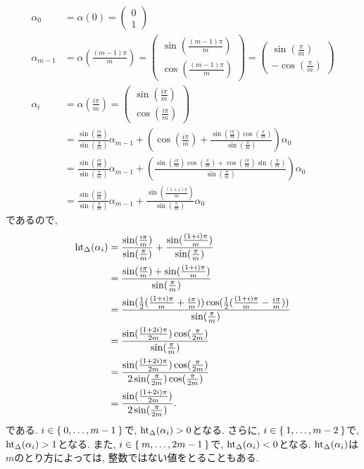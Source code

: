 \begin{align*}
  \alpha_0&=\alpha(0)=\begin{pmatrix}0\\1\end{pmatrix}\\
  \alpha_{m-1}&=\alpha(\frac{(m-1)\pi}{m})=
  \begin{pmatrix}\sin(\frac{(m-1)\pi}{m})\\\cos(\frac{(m-1)\pi}{m})\end{pmatrix}=
\begin{pmatrix}\sin(\frac{\pi}{m})\\-\cos(\frac{\pi}{m})\end{pmatrix}
  \\
  \alpha_{i}&=\alpha(\frac{i\pi}{m})=
  \begin{pmatrix}\sin(\frac{i\pi}{m})\\\cos(\frac{i\pi}{m})\end{pmatrix}\\
  &=
  \frac{\sin(\frac{i\pi}{m})}{\sin(\frac{\pi}{m})}\alpha_{m-1}
  +
  (\cos(\frac{i\pi}{m})+\frac{\sin(\frac{i\pi}{m})\cos(\frac{\pi}{m})}{\sin(\frac{\pi}{m})})\alpha_{0}\\
  &=
  \frac{\sin(\frac{i\pi}{m})}{\sin(\frac{\pi}{m})}\alpha_{m-1}
  +
  (\frac{\sin(\frac{i\pi}{m})\cos(\frac{\pi}{m})+\cos(\frac{i\pi}{m})\sin(\frac{\pi}{m})}{\sin(\frac{\pi}{m})})\alpha_{0}\\
  &=
  \frac{\sin(\frac{i\pi}{m})}{\sin(\frac{\pi}{m})}\alpha_{m-1}
  +
  \frac{\sin(\frac{(1+i)\pi}{m})}{\sin(\frac{\pi}{m})}\alpha_{0}
\end{align*}
であるので,
\begin{align*}
  \operatorname{ht}_{\Delta}(\alpha_i)
  &=
  \frac{\sin(\frac{i\pi}{m})}{\sin(\frac{\pi}{m})}
  +
  \frac{\sin(\frac{(1+i)\pi}{m})}{\sin(\frac{\pi}{m})}\\
  &=
  \frac{\sin(\frac{i\pi}{m})+\sin(\frac{(1+i)\pi}{m})}{\sin(\frac{\pi}{m})}\\
  &=
  \frac{\sin(\frac{1}{2}(\frac{(1+i)\pi}{m}+\frac{i\pi}{m}))\cos(\frac{1}{2}(\frac{(1+i)\pi}{m}-\frac{i\pi}{m}))}{\sin(\frac{\pi}{m})}\\
  &=
  \frac{\sin(\frac{(1+2i)\pi}{2m})\cos(\frac{\pi}{2m})}{\sin(\frac{\pi}{m})}\\
  &=
  \frac{\sin(\frac{(1+2i)\pi}{2m})\cos(\frac{\pi}{2m})}{2\sin(\frac{\pi}{2m})\cos(\frac{\pi}{2m})}\\
  &=
  \frac{\sin(\frac{(1+2i)\pi}{2m})}{2\sin(\frac{\pi}{2m})}.
\end{align*}
である.
$i\in \Set{0,\ldots,m-1}$で, $\operatorname{ht}_\Delta(\alpha_i)>0$となる.
さらに,
$i\in \Set{1,\ldots,m-2}$で, $\operatorname{ht}_\Delta(\alpha_i)>1$となる.
また,
$i\in \Set{m,\ldots,2m-1}$で, $\operatorname{ht}_\Delta(\alpha_i)<0$となる.
$\operatorname{ht}_\Delta(\alpha_i)$は$m$のとり方によっては, 整数ではない値をとることもある.


